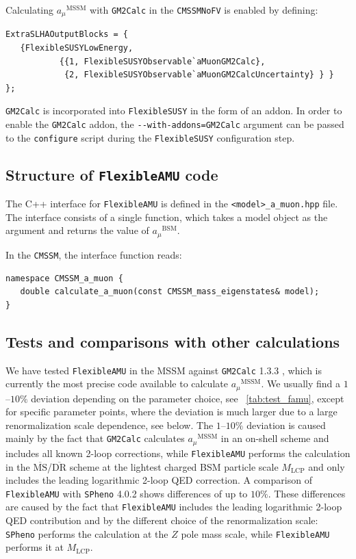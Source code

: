 \documentclass[final,3p,11pt,pdflatex]{elsarticle}
\makeatletter
\newcommand{\modelname}[1]{\texttt{#1}\@\xspace}
\newcommand{\spheno}{\texttt{SPheno}\@\xspace}
\newcommand{\fs}{\texttt{FlexibleSUSY}\@\xspace}
\newcommand{\GMTCalc}{\texttt{GM2Calc}\@\xspace}
\newcommand{\famu}{\texttt{FlexibleAMU}\@\xspace}
\newcommand{\code}[1]{\lstinline|#1|}  %
\newcommand{\ol}[1]{\overline{#1}}
\newcommand{\MSbar}{\ensuremath{\ol{\text{MS}}}\xspace}
\newcommand{\DRbar}{\ensuremath{\ol{\text{DR}}}\xspace}
\newcommand{\BSM}{\ensuremath{\text{BSM}}\xspace}
\newcommand{\MSSM}{\ensuremath{\text{MSSM}}\xspace}
\newcommand{\MLCP}{\ensuremath{M_\text{LCP}}\xspace}
\newcommand{\amu}{\ensuremath{a_\mu}\xspace}
\newcommand{\amuBSM}{\ensuremath{\amu^{\BSM}}\xspace}
\newcommand{\amuMSSM}{\ensuremath{\amu^{\MSSM}}\xspace}
\newcommand{\tabref}[1]{\tablename~\ref{#1}}
\makeatother
\begin{document}
\begin{example}
Calculating \amuMSSM with \GMTCalc in the \modelname{CMSSMNoFV} is
enabled by defining:
%
\begin{lstlisting}
ExtraSLHAOutputBlocks = {
   {FlexibleSUSYLowEnergy,
           {{1, FlexibleSUSYObservable`aMuonGM2Calc},
            {2, FlexibleSUSYObservable`aMuonGM2CalcUncertainty} } }
};
\end{lstlisting}
\end{example}

\GMTCalc is incorporated into \fs in the form of an addon.
In order to enable the \GMTCalc addon, the
\code{--with-addons=GM2Calc} argument can be passed to the
\code{configure} script during the \fs configuration step.

\subsection{Structure of \famu code}

The C++ interface for \famu is defined in the
\code{<model>_a_muon.hpp} file.  The interface consists of a single
function, which takes a model object as the argument and returns the value
of \amuBSM.

\begin{example}
In the \modelname{CMSSM}, the interface function reads:
%
\begin{lstlisting}
namespace CMSSM_a_muon {
   double calculate_a_muon(const CMSSM_mass_eigenstates& model);
}
\end{lstlisting}
\end{example}

\subsection{Tests and comparisons with other calculations}

We have tested \famu in the MSSM against \GMTCalc 1.3.3
\cite{Athron:2015rva}, which is currently the most precise code
available to calculate \amuMSSM.  We usually find a $1$--$10\%$
deviation depending on the parameter choice, see
\tabref{tab:test_famu}, except for specific parameter points, where
the deviation is much larger due to a large renormalization scale
dependence, see below.  The $1$--$10\%$ deviation is caused mainly by
the fact that \GMTCalc calculates \amuMSSM in an on-shell scheme and
includes all known 2-loop corrections, while \famu performs the
calculation in the \MSbar/\DRbar scheme at the lightest charged BSM particle scale $\MLCP$ and only
includes the leading logarithmic 2-loop QED correction.  A comparison
of \famu with \spheno 4.0.2 shows differences of up to $10\%$.  These
differences are caused by the fact that \famu includes the leading
logarithmic 2-loop QED contribution and by the different choice of the
renormalization scale: \spheno performs the calculation at the $Z$ pole
mass scale, while \famu performs it at $\MLCP$.
\end{document}
